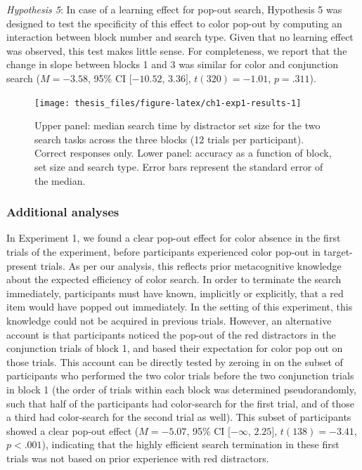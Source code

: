\documentclass[12pt,twoside]{reedthesis}
\begin{document}
\emph{Hypothesis 5}: In case of a learning effect for pop-out search, Hypothesis 5 was designed to test the specificity of this effect to color pop-out by computing an interaction between block number and search type. Given that no learning effect was observed, this test makes little sense. For completeness, we report that the change in slope between blocks 1 and 3 was similar for color and conjunction search (\(M = -3.58\), 95\% CI \([-10.52\), \(3.36]\), \(t(320) = -1.01\), \(p = .311\)).
\begin{figure}[H]
\texttt{[image: thesis\_files/figure-latex/ch1-exp1-results-1]} \caption{Upper panel: median search time by distractor set size for the two search tasks across the three blocks (12 trials per participant). Correct responses only. Lower panel: accuracy as a function of block, set size and search type. Error bars represent the standard error of the median.}\label{fig:ch1-exp1-results}
\end{figure}
\hypertarget{additional-analyses}{%
\subsubsection*{Additional analyses}\label{additional-analyses}}

In Experiment 1, we found a clear pop-out effect for color absence in the first trials of the experiment, before participants experienced color pop-out in target-present trials. As per our analysis, this reflects prior metacognitive knowledge about the expected efficiency of color search. In order to terminate the search immediately, participants must have known, implicitly or explicitly, that a red item would have popped out immediately. In the setting of this experiment, this knowledge could not be acquired in previous trials. However, an alternative account is that participants noticed the pop-out of the red distractors in the conjunction trials of block 1, and based their expectation for color pop out on those trials. This account can be directly tested by zeroing in on the subset of participants who performed the two color trials before the two conjunction trials in block 1 (the order of trials within each block was determined pseudorandomly, such that half of the participants had color-search for the first trial, and of those a third had color-search for the second trial as well). This subset of participants showed a clear pop-out effect (\(M = -5.07\), 95\% CI \([-\infty\), \(2.25]\), \(t(138) = -3.41\), \(p < .001\)), indicating that the highly efficient search termination in these first trials was not based on prior experience with red distractors.
\end{document}
